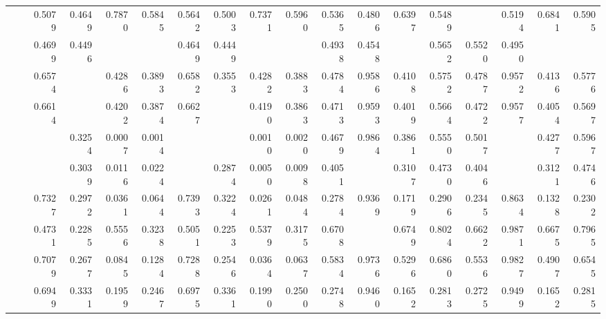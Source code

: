{\begin{table*}[t]
{\begin{tabular}{|l|l|r|r|r|r|r|r|r|r|r|r|r|r|r|r|r|r|}
			      &\CGNPMLP   & 0.5079 & 0.4649 & 0.7870 & 0.5845 & 0.5642 & 0.5003 & 0.7371 & 0.5960 & 0.5365 & 0.4806 & 0.6397 & 0.5489 & \cellcolor{LightCyan}{0.5847} & 0.5194 & 0.6841 & 0.5905 \\
			      &\CGNPGNN   & 0.4699 & 0.4496 & \cellcolor{LightRed}{0.9161} & \cellcolor{LightRed}{0.6032} &  0.4649 & 0.4449 & \cellcolor{LightRed}{0.9205} & \cellcolor{LightCyan}{0.5998} & 0.4938 & 0.4548 & \cellcolor{LightCyan}{0.7464} & 0.5652  &0.5520	&0.4950	&\cellcolor{LightRed}{0.8399}	&\cellcolor{LightCyan}{0.6229}\\\hline\hline
			      
				
				\multirow{11}{*}{\rotatebox{90}{\Reddit}} 
				&\ATC       & 0.6574 & \cellcolor{LightCyan}{0.3566} & 0.4286 & 0.3893 & 0.6582 & 0.3553 & 0.4282 & 0.3883 & 0.4784 & 0.9586 & 0.4108 & 0.5752 & 0.4787 & 0.9572 & 0.4136 & 0.5776 \\
				&\CTC       & 0.6614 & \cellcolor{LightRed}{0.3593} & 0.4202 & 0.3874 & 0.6627 & \cellcolor{LightCyan}{0.3583} & 0.4190 & 0.3863 & 0.4713 & 0.9593 & 0.4019 & 0.5664 & 0.4722 & 0.9577 & 0.4054 & 0.5697 \\\cline{2-18}
				&\MAML      & \cellcolor{LightRed}{0.7450} & 0.3254 & 0.0007 & 0.0014 & \cellcolor{LightRed}{0.7465} & \cellcolor{LightRed}{0.3812} & 0.0010 & 0.0020 & 0.4679 & 0.9864 & 0.3861 & 0.5550 & 0.5017 & \cellcolor{LightCyan}{0.9863} & 0.4277 & 0.5967 \\
				&\Reptile   & \cellcolor{LightCyan}{0.7414} & 0.3039 & 0.0116 & 0.0224 & \cellcolor{LightCyan}{0.7447} & 0.2874 & 0.0050 & 0.0098 & 0.4051 & \cellcolor{LightRed}{0.9904} & 0.3107 & 0.4730 & 0.4046 & \cellcolor{LightRed}{0.9907} & 0.3121 & 0.4746 \\
				&\Featrans  & 0.7327 & 0.2972 & 0.0361 & 0.0644 & 0.7393 & 0.3224 & 0.0261 & 0.0484 & 0.2784 & 0.9369 & 0.1719 & 0.2906 & 0.2345 & 0.8634 & 0.1328 & 0.2302 \\
				&\PN        & 0.4731 & 0.2285 & 0.5556 & 0.3238 & 0.5051 & 0.2253 & 0.5379 & 0.3175 & 0.6708 &\cellcolor{LightCyan}{0.9891} &0.6749 &0.8024 & 0.6622 &0.9871 &0.6675 &0.7965 \\\cline{2-18}
				&\Supervise & 0.7079 & 0.2677 & 0.0845 & 0.1284 & 0.7288 & 0.2546 & 0.0364 & 0.0637 & 0.5834 & 0.9736 & 0.5296 & 0.6860 & 0.5536 & 0.9827 & 0.4907 & 0.6545 \\
				&\ICSGNN    & 0.6949 & 0.3331 & 0.1959 & 0.2467 & 0.6975 & 0.3361 & 0.1990 & 0.2500 & 0.2748 & 0.9460 & 0.1652 & 0.2813 & 0.2725 & 0.9499 & 0.1652 & 0.2815 \\

\end{tabular}}
\end{table*}}
